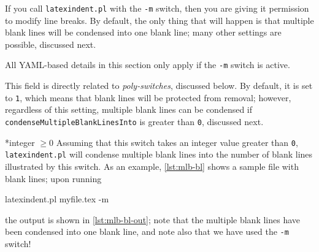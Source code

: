 	\begin{warning}
		If you call \texttt{latexindent.pl} with the \texttt{-m} switch, then you
		are giving it permission to modify line breaks. By default, the only
		thing that will happen is that multiple blank lines will be condensed into
		one blank line; many other settings are possible, discussed next.
	\end{warning}
	All YAML-based details in this section only apply if the \texttt{-m} switch is active.

	This field is directly related to \emph{poly-switches}, discussed below.
	By default, it is set to \texttt{1}, which means that blank lines will
	be protected from removal; however, regardless of this setting, multiple
	blank lines can be condensed if \texttt{condenseMultipleBlankLinesInto} is
	greater than \texttt{0}, discussed next.

*{integer $\geq 0$}
	Assuming that this switch takes an integer value greater than \texttt{0}, \texttt{latexindent.pl} will condense multiple blank lines into
	the number of blank lines illustrated by this switch. As an example, \cref{lst:mlb-bl} shows a sample file
	with blank lines; upon running
	\begin{commandshell}
latexindent.pl myfile.tex -m  
\end{commandshell}
	the output is shown in \cref{lst:mlb-bl-out}; note that the multiple blank lines have been
	condensed into one blank line, and note also that we have used the \texttt{-m} switch!

	\begin{minipage}{.45\textwidth}
	\end{minipage}%
	\hfill
	\begin{minipage}{.45\textwidth}
	\end{minipage}


